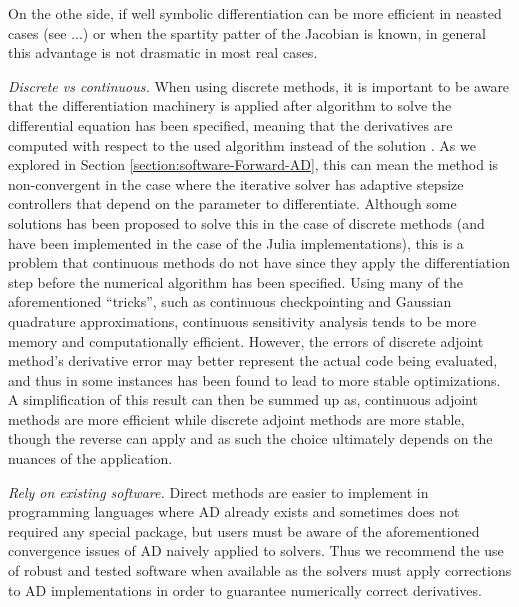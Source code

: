 On the othe side, if well symbolic differentiation can be more efficient in neasted cases (see ...) or when the spartity patter of the Jacobian is known, in general this advantage is not drasmatic in most real cases. 


\vspace{5px}
\noindent\textit{Discrete vs continuous. }
When using discrete methods, it is important to be aware that the differentiation machinery is applied after algorithm to solve the differential equation has been specified, meaning that the derivatives are computed with respect to the used algorithm instead of the solution \cite{Eberhard_Bischof_1996}.
As we explored in Section \ref{section:software-Forward-AD}, this can mean the method is non-convergent in the case where the iterative solver has adaptive stepsize controllers that depend on the parameter to differentiate.
Although some solutions has been proposed to solve this in the case of discrete methods \cite{Eberhard_Bischof_1996} (and have been implemented in the case of the Julia implementations), this is a problem that continuous methods do not have since they apply the differentiation step before the numerical algorithm has been specified. 
Using many of the aforementioned ``tricks'', such as continuous checkpointing and Gaussian quadrature approximations, continuous sensitivity analysis tends to be more memory and computationally efficient. However, the errors of discrete adjoint method's derivative error may better represent the actual code being evaluated, and thus in some instances has been found to lead to more stable optimizations. A simplification of this result can then be summed up as, continuous adjoint methods are more efficient while discrete adjoint methods are more stable\cite{rackauckas2020universal}, though the reverse can apply and as such the choice ultimately depends on the nuances of the application.

\vspace{5px}
\noindent\textit{Rely on existing software. }
Direct methods are easier to implement in programming languages where AD already exists and sometimes does not required any special package, but users must be aware of the aforementioned convergence issues of AD naively applied to solvers. 
Thus we recommend the use of robust and tested software when available as the solvers must apply corrections to AD implementations in order to guarantee numerically correct derivatives.

